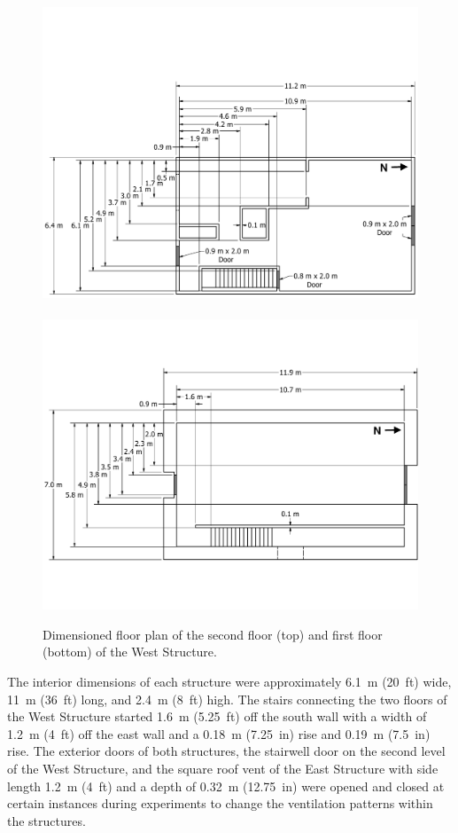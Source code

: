 \documentclass[12pt,oneside]{book}
\begin{document}
\begin{figure}[!ht]
	\includegraphics[width=\columnwidth]{../Figures/Floor_Plans/West_Structure_2nd_Floor_Dimensioned_Full}
	\\~\\
	\includegraphics[width=\columnwidth]{../Figures/Floor_Plans/West_Structure_1st_Floor_Dimensioned_Full}
	\caption[Dimensioned floor plans of the West Structure.]{Dimensioned floor plan of the second floor (top) and first floor (bottom) of the West Structure.}
	\label{fig:west_dimensioned_plan}
\end{figure}

The interior dimensions of each structure were approximately 6.1~m (20~ft) wide, 11~m (36~ft) long, and 2.4~m (8~ft) high. The stairs connecting the two floors of the West Structure started 1.6~m (5.25~ft) off the south wall with a width of 1.2~m (4~ft) off the east wall and a 0.18~m (7.25~in) rise and 0.19~m (7.5~in) rise. The exterior doors of both structures, the stairwell door on the second level of the West Structure, and the square roof vent of the East Structure with side length 1.2~m (4~ft) and a depth of 0.32~m (12.75~in) were opened and closed at certain instances during experiments to change the ventilation patterns within the structures.
\FloatBarrier
\end{document}
